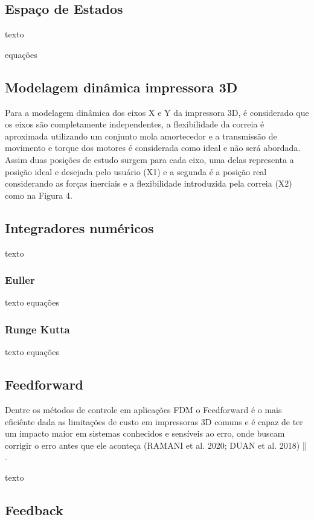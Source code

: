 \subsection{Espaço de Estados}
texto

equações

\subsection{Modelagem dinâmica impressora 3D}

Para a modelagem dinâmica dos eixos X e Y da impressora 3D, 
é considerado que os eixos são completamente independentes, 
a flexibilidade da correia é aproximada utilizando um conjunto 
mola amortecedor e a transmissão de movimento e torque dos 
motores é considerada como ideal e não será abordada.
Assim duas posições de estudo surgem para cada eixo, uma delas 
representa a posição ideal e desejada pelo usuário (X1) e a 
segunda é a posição real considerando as forças inerciais e a 
flexibilidade introduzida pela correia (X2) como na Figura 4.

\subsection{Integradores numéricos}

texto

\subsubsection{Euller}
texto equações


\subsubsection{Runge Kutta}
texto
equações

\subsection{Feedforward}
Dentre os métodos de controle em aplicações FDM o Feedforward 
é o mais eficiênte dada as limitações de custo em impressoras 
3D comuns e é capaz de ter um impacto maior em sistemas 
conhecidos e sensíveis ao erro, onde buscam corrigir o erro 
antes que ele aconteça (RAMANI et al. 2020; DUAN et al. 2018) || \cite{ramani20}\cite{duan18}.

texto

\subsection{Feedback}

